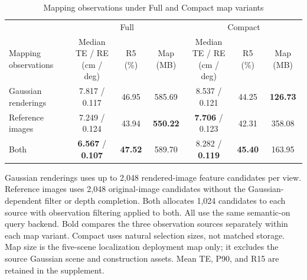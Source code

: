 \begin{table}[tp]
\centering
\footnotesize
\setlength{\tabcolsep}{4pt}
\renewcommand{\arraystretch}{1.12}
\caption{Mapping observations under Full and Compact map variants}
\label{tab:t9}
\begin{tabular}{lcccccc}
\toprule
\multicolumn{1}{c}{} & \multicolumn{3}{c}{Full} & \multicolumn{3}{c}{Compact} \\
\cmidrule(lr){2-4}\cmidrule(lr){5-7}
Mapping observations & \shortstack{Median TE / RE\\(cm / deg)} & R5 (\%) & Map (MB) & \shortstack{Median TE / RE\\(cm / deg)} & R5 (\%) & Map (MB) \\
\midrule
Gaussian renderings & 7.817 / 0.117 & 46.95 & 585.69 & 8.537 / 0.121 & 44.25 & \textbf{126.73} \\
Reference images & 7.249 / 0.124 & 43.94 & \textbf{550.22} & \textbf{7.706} / 0.123 & 42.31 & 358.08 \\
Both & \textbf{6.567} / \textbf{0.107} & \textbf{47.52} & 589.70 & 8.282 / \textbf{0.119} & \textbf{45.40} & 163.95 \\
\bottomrule
\end{tabular}
\par\smallskip\begin{minipage}{0.98\linewidth}\footnotesize Gaussian renderings uses up to 2,048 rendered-image feature candidates per view. Reference images uses 2,048 original-image candidates without the Gaussian-dependent filter or depth completion. Both allocates 1,024 candidates to each source with observation filtering applied to both. All use the same semantic-on query backend. Bold compares the three observation sources separately within each map variant. Compact uses natural selection sizes, not matched storage. Map size is the five-scene localization deployment map only; it excludes the source Gaussian scene and construction assets. Mean TE, P90, and R15 are retained in the supplement.\end{minipage}
\end{table}
